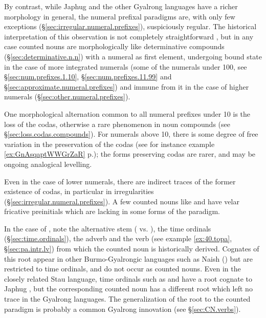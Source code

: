 By contrast, while Japhug and the other Gyalrong languages have a richer morphology in general, the numeral prefixal paradigms are, with only few exceptions (§\ref{sec:irregular.numeral.prefixes}), suspiciously regular. The historical interpretation of this observation is not completely straightforward \citep{jacques17num}, but in any case counted nouns are morphologically like determinative compounds (§\ref{sec:determinative.n.n}) with a numeral as first element, undergoing bound state in the case of more integrated numerals (some of the numerals under 100, see §\ref{sec:num.prefixes.1.10},  §\ref{sec:num.prefixes.11.99} and §\ref{sec:approximate.numeral.prefixes}) and immune from it in the case of higher numerals (§\ref{sec:other.numeral.prefixes}).

One morphological alternation common to all numeral prefixes under 10 is the loss of the codas, otherwise a rare phenomenon in noun compounds (see §\ref{sec:loss.codas.compounds}). For numerals above 10, there is some degree of free variation in the preservation of the codas (see for instance example \ref{ex:GnAsqaptWWGrZaR} p.\pageref{ex:GnAsqaptWWGrZaR}); the forms preserving codas are rarer, and may be ongoing analogical levelling.

Even in the case of lower numerals, there are indirect traces of the former existence of codas, in particular in irregularities (§\ref{sec:irregular.numeral.prefixes}). A few counted nouns like  and  have velar fricative preinitials  which are lacking in some forms of the paradigm. 

In the case of , note the alternative stem  ( vs. ), the time ordinals (§\ref{sec:time.ordinals}), the adverb  and the verb   (see example \ref{ex:40.topa}, §\ref{sec:pa.intr.lv}) from which the counted noun  is historically derived. Cognates of this root  appear in other Burmo-Gyalrongic languages such as Naish (\citealt{jacques.michaud11naish}) but are restricted to time ordinals, and do not occur as counted nouns. Even in the closely related Stau language,  time ordinals such as  and  have a root  cognate to Japhug , but the corresponding counted noun  has a different root which left no trace in the Gyalrong languages. The generalization of the  root to the counted paradigm is probably a common Gyalrong innovation (see §\ref{sec:CN.verbs}). 


